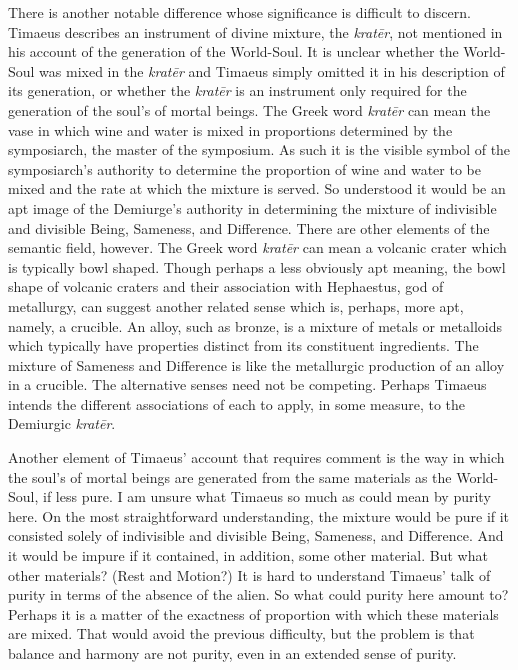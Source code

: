 
There is another notable difference whose significance is difficult to discern. Timaeus describes an instrument of divine mixture, the \emph{kratēr}, not mentioned in his account of the generation of the World-Soul. It is unclear whether the World-Soul was mixed in the \emph{kratēr} and Timaeus simply omitted it in his description of its generation, or whether the \emph{kratēr} is an instrument only required for the generation of the soul's of mortal beings. The Greek word \emph{kratēr} can mean the vase in which wine and water is mixed in proportions determined by the symposiarch, the master of the symposium. As such it is the visible symbol of the symposiarch's authority to determine the proportion of wine and water to be mixed and the rate at which the mixture is served. So understood it would be an apt image of the Demiurge's authority in determining the mixture of indivisible and divisible Being, Sameness, and Difference. There are other elements of the semantic field, however. The Greek word \emph{kratēr} can mean a volcanic crater which is typically bowl shaped. Though perhaps a less obviously apt meaning, the bowl shape of volcanic craters and their association with Hephaestus, god of metallurgy, can suggest another related sense which is, perhaps, more apt, namely, a crucible. An alloy, such as bronze, is a mixture of metals or metalloids which typically have properties distinct from its constituent ingredients. The mixture of Sameness and Difference is like the metallurgic production of an alloy in a crucible. The alternative senses need not be competing. Perhaps Timaeus intends the different associations of each to apply, in some measure, to the Demiurgic \emph{kratēr}.

Another element of Timaeus' account that requires comment is the way in which the soul's of mortal beings are generated from the same materials as the World-Soul, if less pure. I am unsure what Timaeus so much as could mean by purity here. On the most straightforward understanding, the mixture would be pure if it consisted solely of indivisible and divisible Being, Sameness, and Difference. And it would be impure if it contained, in addition, some other material. But what other materials? (Rest and Motion?) It is hard to understand Timaeus' talk of purity in terms of the absence of the alien. So what could purity here amount to? Perhaps it is a matter of the exactness of proportion with which these materials are mixed. That would avoid the previous difficulty, but the problem is that balance and harmony are not purity, even in an extended sense of purity. 

